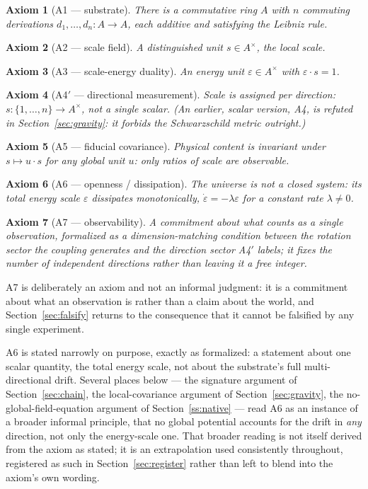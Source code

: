 \documentclass[aps,prd,twocolumn,superscriptaddress,nofootinbib]{revtex4-2}
\newtheorem{axiom}{Axiom}
\begin{document}
\begin{axiom}[A1 — substrate]
There is a commutative ring $A$ with $n$ commuting derivations
$d_1,\dots,d_n : A \to A$, each additive and satisfying the Leibniz rule.
\end{axiom}

\begin{axiom}[A2 — scale field]
A distinguished unit $s \in A^\times$, the local scale.
\end{axiom}

\begin{axiom}[A3 — scale-energy duality]
An energy unit $\varepsilon\in A^\times$ with $\varepsilon\cdot s = 1$.
\end{axiom}

\begin{axiom}[A4$'$ — directional measurement]
Scale is assigned per direction: $s : \{1,\dots,n\}\to A^\times$, not a
single scalar. (An earlier, scalar version, A4, is refuted in
Section~\ref{sec:gravity}: it forbids the Schwarzschild metric outright.)
\end{axiom}

\begin{axiom}[A5 — fiducial covariance]
Physical content is invariant under $s \mapsto u\cdot s$ for any global
unit $u$: only ratios of scale are observable.
\end{axiom}

\begin{axiom}[A6 — openness / dissipation]
The universe is not a closed system: its total energy scale $\varepsilon$
dissipates monotonically, $\dot\varepsilon = -\lambda\varepsilon$ for a
constant rate $\lambda\ne0$.
\end{axiom}

\begin{axiom}[A7 — observability]
A commitment about what counts as a single observation, formalized as a
dimension-matching condition between the rotation sector the coupling
generates and the direction sector A4$'$ labels; it fixes the number of
\emph{independent} directions rather than leaving it a free integer.
\end{axiom}

A7 is deliberately an axiom and not an informal judgment: it is a
commitment about what an observation is rather than a claim about the
world, and Section~\ref{sec:falsify} returns to the consequence that it
cannot be falsified by any single experiment.

A6 is stated narrowly on purpose, exactly as formalized: a statement about
one scalar quantity, the total energy scale, not about the substrate's
full multi-directional drift. Several places below — the signature
argument of Section~\ref{sec:chain}, the local-covariance argument of
Section~\ref{sec:gravity}, the no-global-field-equation argument of
Section~\ref{ss:native} — read A6 as an instance of a broader informal
principle, that no global potential accounts for the drift in
\emph{any} direction, not only the energy-scale one. That broader
reading is not itself derived from the axiom as stated; it is an
extrapolation used consistently throughout, registered as such in
Section~\ref{sec:register} rather than left to blend into the axiom's
own wording.
\end{document}
